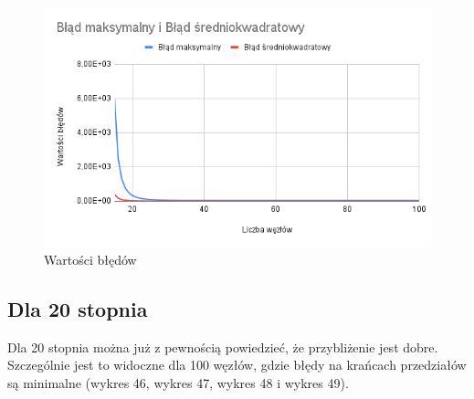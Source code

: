 \documentclass{article}
\begin{document}
\begin{figure}[H]
  \centering
  \begin{minipage}[b]{0.4\textwidth}
    \includegraphics[width=\textwidth]{img45.png}
    \caption{Wartości błędów}
  \end{minipage}
\end{figure}

\newpage

\subsection{Dla 20 stopnia}

Dla 20 stopnia można już z pewnością powiedzieć, że przybliżenie jest dobre. Szczególnie jest to widoczne dla 100 węzłów, gdzie błędy na krańcach przedziałów są minimalne (wykres 46, wykres 47, wykres 48 i wykres 49).
\end{document}
